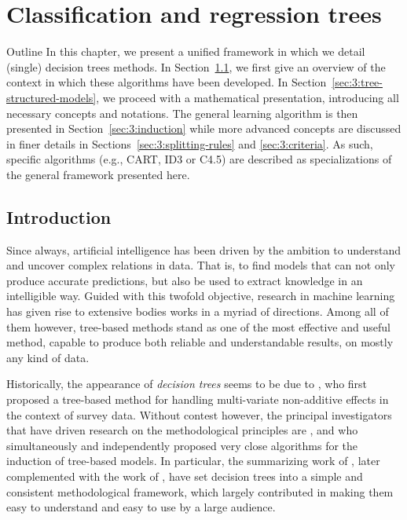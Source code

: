 \chapter{Classification and regression trees}\label{ch:cart}

\begin{remark}{Outline}
In this chapter, we present a unified framework in which we detail (single)
decision trees methods. In Section~\ref{sec:3:introduction}, we first give an
overview of the context in which these algorithms have been developed. In
Section~\ref{sec:3:tree-structured-models}, we proceed with a mathematical
presentation, introducing all necessary concepts and notations. The general
learning algorithm is then presented in Section~\ref{sec:3:induction} while
more advanced concepts are discussed in finer details in Sections~\ref{sec:3:splitting-rules}
and \ref{sec:3:criteria}. As such, specific algorithms (e.g.,
CART, ID3 or C4.5) are described as specializations of the general framework
presented here.
\end{remark}

\section{Introduction}
\label{sec:3:introduction}

Since always, artificial intelligence has been driven by the ambition to
understand and uncover complex relations in data. That is, to find models that
can not only produce accurate predictions, but also be used to extract
knowledge in an intelligible way. Guided with this twofold objective, research
in machine learning has given rise to extensive bodies works in a myriad of
directions. Among all of them however, tree-based methods stand as one of
the most effective and useful method, capable to produce both reliable and
understandable results, on mostly any kind of data.

Historically, the appearance of \textit{decision trees} seems to be due to
\citet{morgan:1963}, who first proposed a tree-based method for handling multi-variate
non-additive effects in the context of survey data. Without contest
however, the principal investigators that have driven research on the
methodological principles  are \citet{breiman:1978a,breiman:1978b},
\citet{friedman:1977,friedman:1979} and \citet{quinlan:1979,quinlan:1986} who
simultaneously and independently proposed very close algorithms for the
induction of tree-based models. In particular, the summarizing work of
\citet{breiman:1984}, later complemented with the work of \citet{quinlan:1993},
have set decision trees into a simple and consistent methodological framework,
which largely contributed in making them easy to understand and easy to use by
a large audience.

